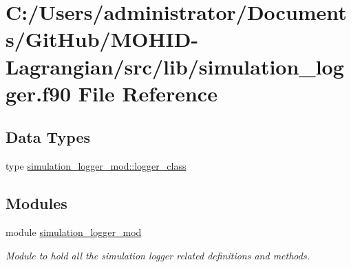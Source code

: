 \hypertarget{simulation__logger_8f90}{}\section{C\+:/\+Users/administrator/\+Documents/\+Git\+Hub/\+M\+O\+H\+I\+D-\/\+Lagrangian/src/lib/simulation\+\_\+logger.f90 File Reference}
\label{simulation__logger_8f90}
\subsection*{Data Types}
\begin{DoxyCompactItemize}
\item 
type \hyperlink{structsimulation__logger__mod_1_1logger__class}{simulation\+\_\+logger\+\_\+mod\+::logger\+\_\+class}
\end{DoxyCompactItemize}
\subsection*{Modules}
\begin{DoxyCompactItemize}
\item 
module \hyperlink{namespacesimulation__logger__mod}{simulation\+\_\+logger\+\_\+mod}
\begin{DoxyCompactList}\small\item\em Module to hold all the simulation logger related definitions and methods. \end{DoxyCompactList}\end{DoxyCompactItemize}
